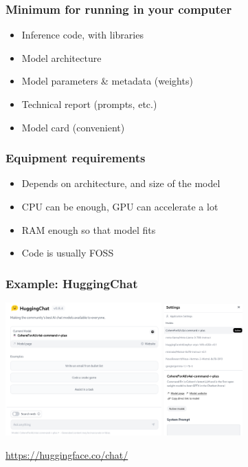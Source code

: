 \documentclass[17pt,aspectratio=169,hyperref={pdfusetitle,colorlinks,allcolors=olive}]{beamer}
\begin{document}
\begin{frame}[fragile]
\frametitle{Minimum for running in your computer}

\begin{itemize}
\item Inference code, with libraries
\item Model architecture
\item Model parameters \& metadata (weights)
\item Technical report (prompts, etc.)
\item Model card (convenient)
\end{itemize}

\end{frame}

\begin{frame}[fragile]
\frametitle{Equipment requirements}

\begin{itemize}
\item Depends on architecture, and size of the model
\item CPU can be enough, GPU can accelerate a lot
\item RAM enough so that model fits
\item Code is usually FOSS
\end{itemize}

\end{frame}

\begin{frame}[fragile]
\frametitle{Example: HuggingChat}

\begin{center}
  \includegraphics[width=6cm]{figs/huggingchat}
  \includegraphics[width=3cm]{figs/huggingchat-models}
\end{center}

\begin{flushright}
  {\small
    \url{https://huggingface.co/chat/}
  }
\end{flushright}
\end{frame}
\end{document}
